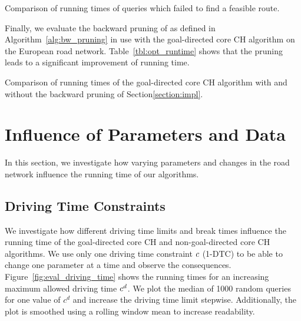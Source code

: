 \begin{table}[hbtp]
	\centering
	
	\caption{Comparison of running times of queries which failed to find a feasible route.}
	\label{tbl:times_no_path}
\end{table}

Finally, we evaluate the backward pruning of as defined in Algorithm~\ref{alg:bw_pruning} in use with the goal-directed core CH algorithm on the European road network. Table~\ref{tbl:opt_runtime} shows that the pruning leads to a significant improvement of running time.

\begin{table}[hbtp]
	\centering
	
	\caption{Comparison of running times of the goal-directed core CH algorithm with and without the backward pruning of Section\ref{section:impl}.}
	\label{tbl:opt_runtime}
\end{table}

\section{Influence of Parameters and Data}
In this section, we investigate how varying parameters and changes in the road network influence the running time of our algorithms.

\subsection{Driving Time Constraints}
We investigate how different driving time limits and break times influence the running time of the goal-directed core CH and non-goal-directed core CH algorithms. We use only one driving time constraint $c$ (1-DTC) to be able to change one parameter at a time and observe the consequences. Figure~\ref{fig:eval_driving_time} shows the running times for an increasing maximum allowed driving time $c^d$. We plot the median of 1000 random queries for one value of $c^d$ and increase the driving time limit stepwise. Additionally, the plot is smoothed using a rolling window mean to increase readability.

